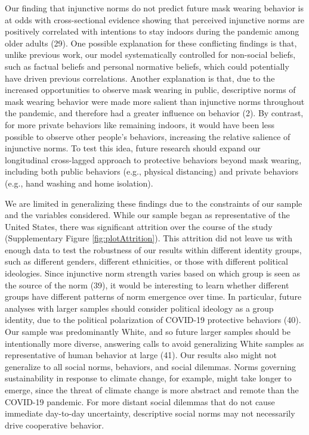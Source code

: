 \documentclass[
  man,floatsintext]{apa6}
\begin{document}
Our finding that injunctive norms do not predict future mask wearing behavior is at odds with cross-sectional evidence showing that perceived injunctive norms are positively correlated with intentions to stay indoors during the pandemic among older adults (29). One possible explanation for these conflicting findings is that, unlike previous work, our model systematically controlled for non-social beliefs, such as factual beliefs and personal normative beliefs, which could potentially have driven previous correlations. Another explanation is that, due to the increased opportunities to observe mask wearing in public, descriptive norms of mask wearing behavior were made more salient than injunctive norms throughout the pandemic, and therefore had a greater influence on behavior (2). By contrast, for more private behaviors like remaining indoors, it would have been less possible to observe other people's behaviors, increasing the relative salience of injunctive norms. To test this idea, future research should expand our longitudinal cross-lagged approach to protective behaviors beyond mask wearing, including both public behaviors (e.g., physical distancing) and private behaviors (e.g., hand washing and home isolation).

We are limited in generalizing these findings due to the constraints of our sample and the variables considered. While our sample began as representative of the United States, there was significant attrition over the course of the study (Supplementary Figure \ref{fig:plotAttrition}). This attrition did not leave us with enough data to test the robustness of our results within different identity groups, such as different genders, different ethnicities, or those with different political ideologies. Since injunctive norm strength varies based on which group is seen as the source of the norm (39), it would be interesting to learn whether different groups have different patterns of norm emergence over time. In particular, future analyses with larger samples should consider political ideology as a group identity, due to the political polarization of COVID-19 protective behaviors (40). Our sample was predominantly White, and so future larger samples should be intentionally more diverse, answering calls to avoid generalizing White samples as representative of human behavior at large (41). Our results also might not generalize to all social norms, behaviors, and social dilemmas. Norms governing sustainability in response to climate change, for example, might take longer to emerge, since the threat of climate change is more abstract and remote than the COVID-19 pandemic. For more distant social dilemmas that do not cause immediate day-to-day uncertainty, descriptive social norms may not necessarily drive cooperative behavior.
\end{document}
